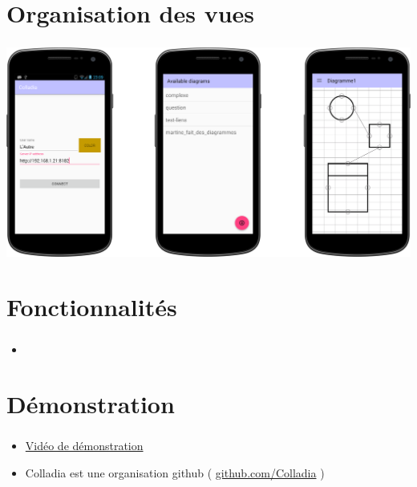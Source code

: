 \documentclass[11pt]{beamer}
\begin{document}
\section{Organisation des vues}
\begin{frame}
	\frametitle{\currentname}
	\begin{center}
		\includegraphics[width=\textwidth]{img/screens}
	\end{center}
\end{frame}

\section{Fonctionnalités}
\begin{frame}
	\frametitle{\currentname}
\begin{itemize}
  \item 
\end{itemize}
\end{frame}

\section{Démonstration}
\begin{frame}
	\frametitle{\currentname}
	\begin{itemize}
	\item \href{https://www.youtube.com/watch?v=1xX70e88ro8}{Vidéo de démonstration}
  \vspace*{\fill}
	\item Colladia est une organisation github ( \href{https://github.com/Colladia/}{github.com/Colladia} )
	\end{itemize}
\end{frame}
\end{document}
